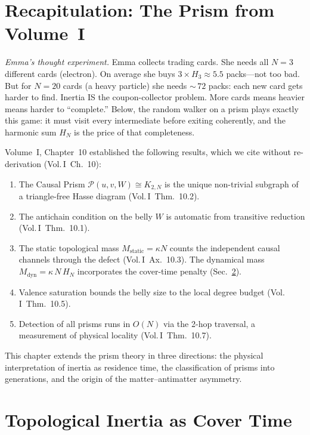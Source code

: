 \documentclass[11pt, a4paper, openany]{book}
\newcommand{\VolI}[1]{\textnormal{(Vol.\,I~#1)}}
\begin{document}
\section{Recapitulation: The Prism from Volume~I}

\smallskip\noindent
\textit{Emma's thought experiment.}
Emma collects trading cards. She needs all $N = 3$ different cards
(electron). On average she buys $3 \times H_3 \approx 5.5$ packs---not
too bad. But for $N = 20$ cards (a heavy particle) she needs
${\sim}\,72$ packs: each new card gets harder to find. Inertia IS the
coupon-collector problem. More cards means heavier means harder to
``complete.'' Below, the random walker on a prism plays exactly this
game: it must visit every intermediate before exiting coherently, and the
harmonic sum $H_N$ is the price of that completeness.
\smallskip

\noindent
Volume~I, Chapter~10 established the following results, which we cite without re-derivation \VolI{Ch.~10}:

\begin{enumerate}
  \item The Causal Prism $\mathcal{P}(u,v,W) \cong K_{2,N}$ is the unique non-trivial subgraph of a triangle-free Hasse diagram \VolI{Thm.~10.2}.
  \item The antichain condition on the belly $W$ is automatic from transitive reduction \VolI{Thm.~10.1}.
  \item The static topological mass $M_{\mathrm{static}} = \kappa N$ counts the independent causal channels through the defect \VolI{Ax.~10.3}.  The dynamical mass $M_{\mathrm{dyn}} = \kappa\,N\,H_N$ incorporates the cover-time penalty (Sec.~\ref{sec:inertia}).
  \item Valence saturation bounds the belly size to the local degree budget \VolI{Thm.~10.5}.
  \item Detection of all prisms runs in $O(N)$ via the 2-hop traversal, a measurement of physical locality \VolI{Thm.~10.7}.
\end{enumerate}

\noindent
This chapter extends the prism theory in three directions: the physical interpretation of inertia as residence time, the classification of prisms into generations, and the origin of the matter--antimatter asymmetry.

\section{Topological Inertia as Cover Time}\label{sec:inertia}
\end{document}
